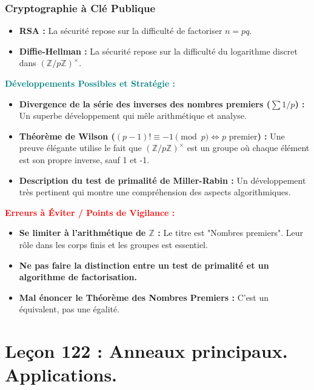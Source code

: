 \documentclass[12pt, a4paper, parskip=full]{report}
\theoremstyle{agregstyle}
\newenvironment{developpements}
  {\par\medskip\noindent\begin{oframed}\noindent\textbf{\textcolor{teal}{Développements Possibles et Stratégie :}}}
  {\end{oframed}\par\medskip}
\newenvironment{erreurs}
  {\par\medskip\noindent\begin{oframed}\noindent\textbf{\textcolor{red}{Erreurs à Éviter / Points de Vigilance :}}}
  {\end{oframed}\par\medskip}
\begin{document}
\subsection{Cryptographie à Clé Publique}
\begin{itemize}
    \item \textbf{RSA :} La sécurité repose sur la difficulté de factoriser $n=pq$.
    \item \textbf{Diffie-Hellman :} La sécurité repose sur la difficulté du logarithme discret dans $(\mathbb{Z}/p\mathbb{Z})^\times$.
\end{itemize}

\begin{developpements}
    \begin{itemize}
        \item \textbf{Divergence de la série des inverses des nombres premiers ($\sum 1/p$) :} Un superbe développement qui mêle arithmétique et analyse.
        \item \textbf{Théorème de Wilson ($ (p-1)! \equiv -1 \pmod p \iff p \text{ premier}$) :} Une preuve élégante utilise le fait que $(\mathbb{Z}/p\mathbb{Z})^\times$ est un groupe où chaque élément est son propre inverse, sauf 1 et -1.
        \item \textbf{Description du test de primalité de Miller-Rabin :} Un développement très pertinent qui montre une compréhension des aspects algorithmiques.
    \end{itemize}
\end{developpements}

\begin{erreurs}
    \begin{itemize}
        \item \textbf{Se limiter à l'arithmétique de $\mathbb{Z}$ :} Le titre est "Nombres premiers". Leur rôle dans les corps finis et les groupes est essentiel.
        \item \textbf{Ne pas faire la distinction entre un test de primalité et un algorithme de factorisation.}
        \item \textbf{Mal énoncer le Théorème des Nombres Premiers :} C'est un équivalent, pas une égalité.
    \end{itemize}
\end{erreurs}

\newpage
\chapter{Leçon 122 : Anneaux principaux. Applications.}
\end{document}
